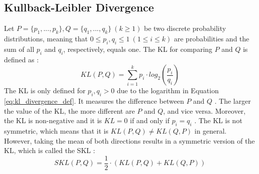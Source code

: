 \subsection{Kullback-Leibler Divergence} \label{KL_Div_Subsection}
Let $P = \{p_1, ..., p_k\}, Q = \{q_1, ..., q_k\} \ (k \geq 1)$ be two discrete probability distributions, meaning that $0 \leq p_i, q_i \leq 1 \ (1 \leq i \leq k)$ are probabilities and the sum of all $p_i$ and $q_i$, respectively, equals one. The \ac{KL} for comparing $P$ and $Q$ is defined as \cite{Persist}:
\begin{equation}
KL(P,Q) = \sum_{i=1}^{k}p_i \cdot log_2(\frac{p_i}{q_i})
\label{eq:kl_divergence_def}
\end{equation}
The \ac{KL} is only defined for $p_i, q_i > 0$ due to the logarithm in Equation \ref{eq:kl_divergence_def}. It measures the difference between $P$ and $Q$ \cite{KL_Divergence_Book}. The larger the value of the \ac{KL}, the more different are $P$ and $Q$, and vice versa. Moreover, the \ac{KL} is non-negative and it is $KL = 0$ if and only if $p_i = q_i$ \cite{KL_Divergence_Book}. The \ac{KL} is not symmetric, which means that it is $KL(P,Q) \neq KL(Q,P)$ in general. However, taking the mean of both directions results in a symmetric version of the \ac{KL}, which is called the \ac{SKL} \cite{Persist}:
\begin{equation}
SKL(P,Q) = \frac{1}{2} \cdot (KL(P,Q) + KL(Q,P))
\label{eq:symm_kl_divergence_def}
\end{equation}